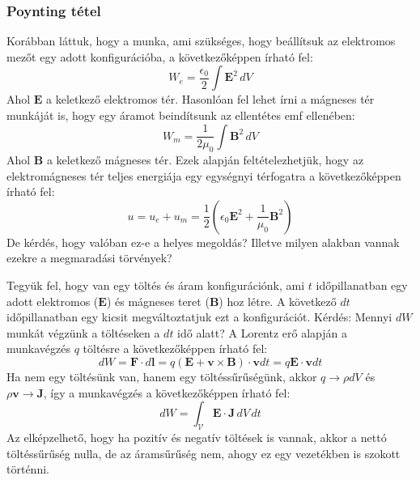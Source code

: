 \documentclass[../main.tex]{subfiles}
\begin{document}
\subsubsection{Poynting tétel}
Korábban láttuk, hogy a munka, ami szükséges, hogy beállítsuk az elektromos mezőt egy adott konfigurációba, a következőképpen írható fel:
\begin{equation}
    W_e = \frac{\epsilon_0}{2} \int \mathbf{E}^2 \, dV
\end{equation}
Ahol $\mathbf{E}$ a keletkező elektromos tér. Hasonlóan fel lehet írni a mágneses tér munkáját is, hogy egy áramot beindítsunk az ellentétes emf ellenében:
\begin{equation}
    W_m = \frac{1}{2 \mu_0} \int \mathbf{B}^2 \, dV
\end{equation}
Ahol $\mathbf{B}$ a keletkező mágneses tér. Ezek alapján feltételezhetjük, hogy az elektromágneses tér teljes energiája egy egységnyi térfogatra a következőképpen írható fel:
\begin{equation}
    \boxed{u = u_e + u_m = \frac{1}{2} \left( \epsilon_0 \mathbf{E}^2 + \frac{1}{\mu_0} \mathbf{B}^2 \right)}
\end{equation}
De kérdés, hogy valóban ez-e a helyes megoldás? Illetve milyen alakban vannak ezekre a megmaradási törvények?

Tegyük fel, hogy van egy töltés és áram konfigurációnk, ami $t$ időpillanatban egy adott elektromos ($\mathbf{E}$) és mágneses teret ($\mathbf{B}$) hoz létre.
A következő $dt$ időpillanatban egy kicsit megváltoztatjuk ezt a konfigurációt. Kérdés: Mennyi $dW$ munkát végzünk a töltéseken a $dt$ idő alatt?
A Lorentz erő alapján a munkavégzés $q$ töltésre a következőképpen írható fel:
\begin{equation}
    dW = \mathbf{F} \cdot d\mathbf{l} = q (\mathbf{E} + \mathbf{v} \times \mathbf{B}) \cdot \mathbf{v} dt = q \mathbf{E} \cdot \mathbf{v} dt
\end{equation}
Ha nem egy töltésünk van, hanem egy töltéssűrűségünk, akkor $q \rightarrow \rho dV$ és $\rho \mathbf{v} \rightarrow \mathbf{J}$, így a munkavégzés a következőképpen írható fel:
\begin{equation}
    dW = \int_{\mathcal{V}} \mathbf{E} \cdot \mathbf{J} \, dV \, dt
\end{equation}
Az elképzelhető, hogy ha pozitív és negatív töltések is vannak, akkor a nettó töltéssűrűség nulla, de az áramsűrűség nem, ahogy ez egy vezetékben is szokott történni.
\end{document}
